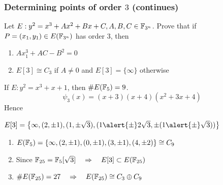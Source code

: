 \documentclass[10pt,handout]{beamer} %
\begin{document}
\begin{frame}\frametitle{Determining points of order $3$ (continues)}

\begin{exercise} Let $E: y^2=x^3+Ax^2+Bx+C, A,B,C\in\mathbb F_{3^n}$. Prove that if $P=(x_1,y_1)\in E(\mathbb F_{3^n})$
has order $3$, then
\begin{enumerate}[<+-| alert@+>]
 \item $Ax_1^3+AC-B^2=0$
 \item $E[3]\cong C_3$ if $A\neq0$ and $E[3]=\{\infty\}$ otherwise
\end{enumerate}
\end{exercise}\pause

\begin{example}
If $E: y^2=x^3+x+1$, then $\#E(\mathbb F_5)=9$.\pause
$$\psi_3(x)=(x + 3)(x + 4)(x^2 + 3x + 4)$$
Hence
\centerline{$E[3]=\left\{
\infty,(2,\pm1),(1,\pm\sqrt{3}),(1\alert{\pm}2\sqrt{3},\pm(1\alert{\pm}\sqrt{3}))\right\}$}\pause
\begin{enumerate}[<+-| alert@+>]
 \item $E(\mathbb F_5)=\{\infty,(2,\pm1),(0,\pm1),(3,\pm1),(4,\pm2)\}\cong C_9$
 \item Since $\mathbb F_{25}=\mathbb F_5[\sqrt{3}]\quad\Rightarrow\quad  E[3]\subset E(\mathbb F_{25})$
 \item $\#E(\mathbb F_{25})=27\quad\Rightarrow\quad E(\mathbb F_{25})\cong C_3\oplus C_9$
\end{enumerate}


\end{example}
\end{frame}
\end{document}
